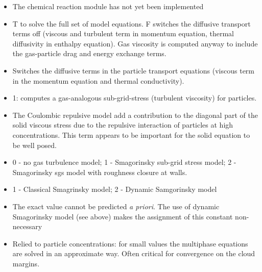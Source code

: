 \begin{itemize}

\item
{}
{The chemical reaction module has not yet been implemented}

\item
{}
{T to solve the full set of model equations. F switches the diffusive
transport terms off (viscous and turbulent term in momentum equation, thermal
diffusivity in enthalpy equation). 
Gas viscosity is computed anyway to include the gas-particle drag and
energy exchange terms.}

\item
{}
{Switches the diffusive terms in the particle transport equations 
(viscous term in the momentum equation and thermal conductivity).}

\item
{}
{1: computes a gas-analogous sub-grid-stress (turbulent viscosity)
for particles.}

\item
{}
{The Coulombic repulsive model add a contribution to the diagonal part of
the solid viscous stress due to the repulsive interaction of particles 
at high concentrations. This term appears to be important for the solid
equation to be well posed.}

\item
{}
{0 - no gas turbulence model; 1 - Smagorinsky sub-grid stress model;
2 - Smagorinsky sgs model with roughness closure at walls.}

\item
{}
{1 - Classical Smagrinsky model; 2 - Dynamic Samgorinsky model}

\item
{}
{The exact value cannot be predicted {\it a priori}. The use of dynamic
Smagorinsky model (see above) makes the assignment of this constant
non-necessary}

\item
{}
{Relied to particle concentrations: for small values the multiphase equations
are solved in an approximate way. Often critical for convergence on the cloud 
margins.}


\end{itemize}
